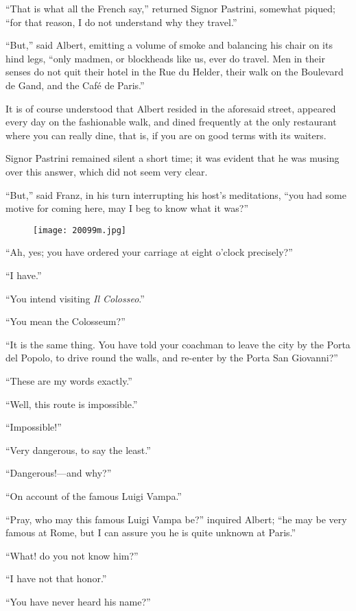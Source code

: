 “That is what all the French say,” returned Signor Pastrini, somewhat
piqued; “for that reason, I do not understand why they travel.”

“But,” said Albert, emitting a volume of smoke and balancing his chair
on its hind legs, “only madmen, or blockheads like us, ever do travel.
Men in their senses do not quit their hotel in the Rue du Helder, their
walk on the Boulevard de Gand, and the Café de Paris.”

It is of course understood that Albert resided in the aforesaid street,
appeared every day on the fashionable walk, and dined frequently at the
only restaurant where you can really dine, that is, if you are on good
terms with its waiters.

Signor Pastrini remained silent a short time; it was evident that he
was musing over this answer, which did not seem very clear.

“But,” said Franz, in his turn interrupting his host’s meditations,
“you had some motive for coming here, may I beg to know what it was?”

\begin{figure}[ht]
\texttt{[image: 20099m.jpg]}
\end{figure}

“Ah, yes; you have ordered your carriage at eight o’clock precisely?”

“I have.”

“You intend visiting \textit{Il Colosseo}.”

“You mean the Colosseum?”

“It is the same thing. You have told your coachman to leave the city by
the Porta del Popolo, to drive round the walls, and re-enter by the
Porta San Giovanni?”

“These are my words exactly.”

“Well, this route is impossible.”

“Impossible!”

“Very dangerous, to say the least.”

“Dangerous!—and why?”

“On account of the famous Luigi Vampa.”

“Pray, who may this famous Luigi Vampa be?” inquired Albert; “he may be
very famous at Rome, but I can assure you he is quite unknown at
Paris.”

“What! do you not know him?”

“I have not that honor.”

“You have never heard his name?”

